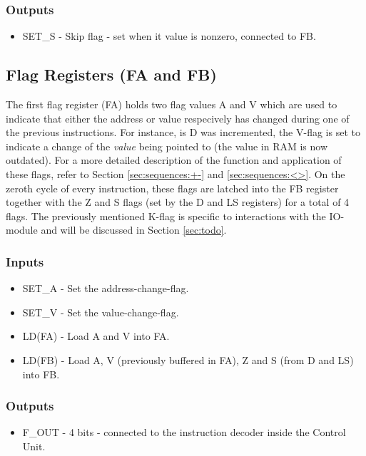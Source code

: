 \subsubsection*{Outputs}
\begin{itemize}
\itemsep0em 
\item SET\_S - Skip flag - set when it value is nonzero, connected to FB.
\end{itemize}

\subsection{Flag Registers (FA and FB)} \label{sec:architecture:flags}
The first flag register (FA) holds two flag values A and V which are used to indicate that either the address or value respecively has changed during one of the previous instructions. For instance, is D was incremented, the V-flag is set to indicate a change of the \emph{value} being pointed to (the value in RAM is now outdated). For a more detailed description of the function and application of these flags, refer to Section \ref{sec:sequences:+-} and \ref{sec:sequences:<>}. On the zeroth cycle of every instruction, these flags are latched into the FB register together with the Z and S flags (set by the D and LS registers) for a total of 4 flags. The previously mentioned K-flag is specific to interactions with the IO-module and will be discussed in Section \ref{sec:todo}.

\subsubsection*{Inputs}
\begin{itemize}
\itemsep0em 
\item SET\_A - Set the address-change-flag.
\item SET\_V - Set the value-change-flag.
\item LD(FA) - Load A and V into FA.
\item LD(FB) - Load A, V (previously buffered in FA), Z and S (from D and LS) into FB. 
\end{itemize}

\subsubsection*{Outputs}
\begin{itemize}
\itemsep0em 
\item F\_OUT - 4 bits - connected to the instruction decoder inside the Control Unit.
\end{itemize}


